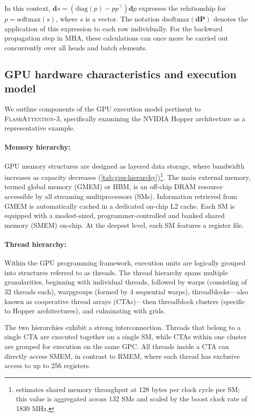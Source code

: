\begin{enumerate}
In this context, $\mathbf{d}s = (\mathrm{diag}(p) - p p^\top)\mathbf{d}p$ expresses the relationship for $p = \mathrm{softmax}(s)$, where $s$ is a vector. The notation $\mathrm{dsoftmax}(\mathbf{dP})$ denotes the application of this expression to each row individually. For the backward propagation step in MHA, these calculations can once more be carried out concurrently over all heads and batch elements.

\subsection{GPU hardware characteristics and execution model}
\label{subsec:hardware}

We outline components of the GPU execution model pertinent to \textsc{FlashAttention-3}, specifically examining the NVIDIA Hopper architecture as a representative example.

\paragraph{Memory hierarchy:} GPU memory structures are designed as layered data storage, where bandwidth increases as capacity decreases (\cref{tab:gpu-hierarchy})\footnote{\citet{luo2024benchmarking} estimates shared memory throughput at 128 bytes per clock cycle per SM; this value is aggregated across 132 SMs and scaled by the boost clock rate of 1830 MHz.}. The main external memory, termed global memory (GMEM) or HBM, is an off-chip DRAM resource accessible by all streaming multiprocessors (SMs). Information retrieved from GMEM is automatically cached in a dedicated on-chip L2 cache. Each SM is equipped with a modest-sized, programmer-controlled and banked shared memory (SMEM) on-chip. At the deepest level, each SM features a register file.

\paragraph{Thread hierarchy:} Within the GPU programming framework, execution units are logically grouped into structures referred to as threads. The thread hierarchy spans multiple granularities, beginning with individual threads, followed by warps (consisting of 32 threads each), warpgroups (formed by 4 sequential warps), threadblocks—also known as cooperative thread arrays (CTAs)—then threadblock clusters (specific to Hopper architectures), and culminating with grids.

The two hierarchies exhibit a strong interconnection. Threads that belong to a single CTA are executed together on a single SM, while CTAs within one cluster are grouped for execution on the same GPC. All threads inside a CTA can directly access SMEM, in contrast to RMEM, where each thread has exclusive access to up to 256 registers.


\end{enumerate}
